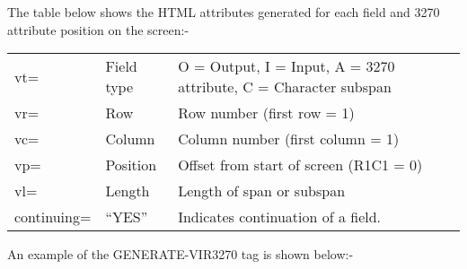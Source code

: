 \documentclass[letterpaper,10pt,english]{sphinxmanual}
\begin{document}
The table below shows the HTML attributes generated for each field and 3270 attribute position on the screen:-


\begin{savenotes}\sphinxattablestart
\centering
\begin{tabulary}{\linewidth}[t]{|T|T|T|}
\hline
{}\relax &\relax &\relax \\
\hline
vt=
&
Field type
&
O = Output, I = Input, A = 3270 attribute, C = Character subspan
\\
\hline
vr=
&
Row
&
Row number (first row = 1)
\\
\hline
vc=
&
Column
&
Column number (first column = 1)
\\
\hline
vp=
&
Position
&
Offset from start of screen (R1C1 = 0)
\\
\hline
vl=
&
Length
&
Length of span or subspan
\\
\hline
continuing=
&
“YES”
&
Indicates continuation of a field.
\\
\hline
\end{tabulary}
\par
\sphinxattableend\end{savenotes}

An example of the GENERATE-VIR3270 tag is shown below:-
\end{document}

